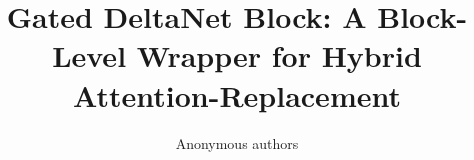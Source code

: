 \title{\textbf{Gated DeltaNet Block: A Block-Level Wrapper for Hybrid Attention-Replacement}}

\author{Anonymous authors}
